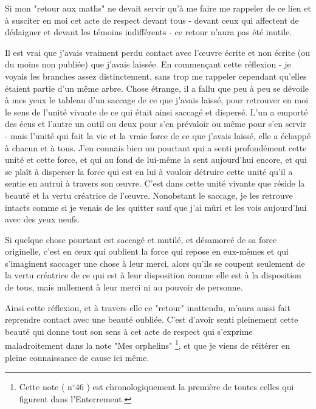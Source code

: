 Si mon "retour aux maths" ne devait servir qu'à me faire me rappeler de ce lien et à susciter en moi cet acte de respect devant tous - devant ceux qui affectent de dédaigner et devant les témoins indifférents - ce retour n'aura pas été inutile.

Il est vrai que j'avais vraiment perdu contact avec l'œuvre écrite et non écrite (ou du moins non publiée) que j'avais laissée. En commençant cette réflexion - je voyais les branches assez distinctement, sans trop me rappeler cependant qu'elles étaient partie d'un même arbre. Chose étrange, il a fallu que peu à peu se dévoile à mes yeux le tableau d'un saccage de ce que j'avais laissé, pour retrouver en moi le sens de l'unité vivante de ce qui était ainsi saccagé et dispersé. L'un a emporté des écus et l'autre un outil ou deux pour s'en prévaloir ou même pour s'en servir - mais l'unité qui fait la vie et la vraie force de ce que j'avais laissé, elle a échappé à chacun et à tous. J'en connais bien un pourtant qui a senti profondément cette unité et cette force, et qui au fond de lui-même la sent aujourd'hui encore, et qui se plaît à disperser la force qui est en lui à vouloir détruire cette unité qu'il a sentie en autrui à travers son œuvre. C'est dans cette unité vivante que réside la beauté et la vertu créatrice de l'œuvre. Nonobstant le saccage, je les retrouve intacts comme si je venais de les quitter sauf que j'ai mûri et les vois aujourd'hui avec des yeux neufs.

Si quelque chose pourtant est saccagé et mutilé, et désamorcé de sa force originelle, c'est en ceux qui oublient la force qui repose en eux-mêmes et qui s'imaginent saccager une chose à leur merci, alors qu'ils se coupent seulement de la vertu créatrice de ce qui est à leur disposition comme elle est à la disposition de tous, mais nullement à leur merci ni au pouvoir de personne.

Ainsi cette réflexion, et à travers elle ce "retour" inattendu, m'aura aussi fait reprendre contact avec une beauté oubliée. C'est d'avoir senti pleinement cette beauté qui donne tout son sens à cet acte de respect qui s'exprime maladroitement dans la note "Mes orphelins" \footnote{Cette note ( $\mathrm{n}^{\circ} 46$ ) est chronologiquement la première de toutes celles qui figurent dans l'Enterrement.}, et que je viens de réitérer en pleine connaissance de cause ici même.



